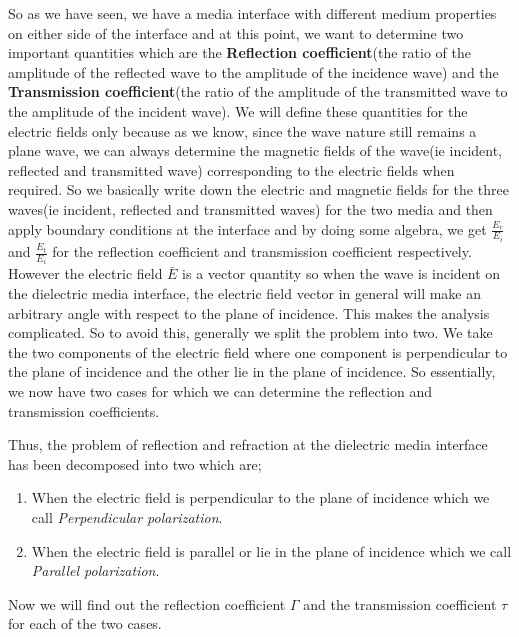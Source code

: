 So as we have seen, we have a media interface with different medium properties on either side of the interface and at this point, we want to determine two important quantities which are the \textbf{Reflection coefficient}(the ratio of the amplitude of the reflected wave to the amplitude of the incidence wave) and the \textbf{Transmission coefficient}(the ratio of the amplitude of the transmitted wave to the amplitude of the incident wave). We will define these quantities for the electric fields only because as we know, since the wave nature still remains a plane wave, we can always determine the magnetic fields of the wave(ie incident, reflected and transmitted wave) corresponding to the electric fields when required.
So we basically write down the electric and magnetic fields for the three waves(ie incident, reflected and transmitted waves) for the two media and then apply boundary conditions at the interface and by doing some algebra, we get $\frac{E_{r}}{E_{i}}$ and $\frac{E_{t}}{E_{i}}$ for the reflection coefficient and transmission coefficient respectively. However the electric field $\bar{E}$ is a vector quantity so when the wave is incident on the dielectric media interface, the electric field vector in general will make an arbitrary angle with respect to the plane of incidence. This makes the analysis complicated. So to avoid this, generally we split the problem into two. We take the two components of the electric field where one component is perpendicular to the plane of incidence and the other lie in the plane of incidence.
So essentially, we now have two cases for which we can determine the reflection and transmission coefficients.

Thus, the problem of reflection and refraction at the dielectric media interface has been decomposed into two which are;

\begin{enumerate}
	\item When the electric field is perpendicular to the plane of incidence which we call \emph{Perpendicular polarization}.
	\item When the electric field is parallel or lie in the plane of incidence which we call \emph{Parallel polarization}.
\end{enumerate}

Now we will find out the reflection coefficient $\Gamma$ and the transmission coefficient $\tau$ for each of the two cases.

